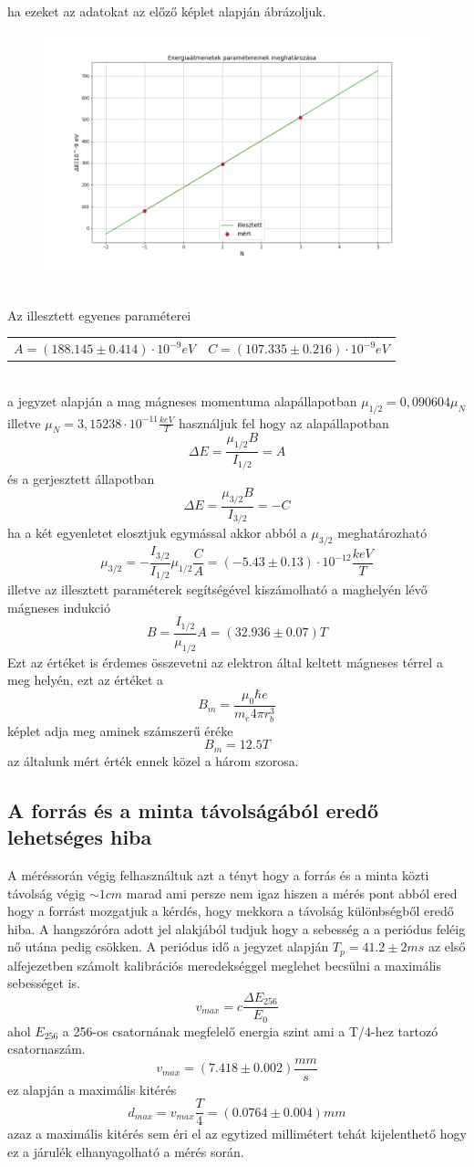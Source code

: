 \documentclass[a4paper,12pt]{article}
\numberwithin{equation}{subsection}
\begin{document}
\newpage
ha ezeket az adatokat az előző képlet alapján ábrázoljuk. 
\begin{figure}[h!]
\centering
\includegraphics[width=12cm]{parameterek.png}
\end{figure}
\\Az illesztett egyenes paraméterei 
\begin{table}[h!]
\centering
\begin{tabular}{c c}
$A=(188.145 \pm 0.414)\cdot 10^{-9} eV$ & $C=(107.335\pm0.216)\cdot 10^{-9}eV$
\end{tabular}
\end{table}
\\a jegyzet alapján a mag mágneses momentuma alapállapotban $\mu_{1/2}=0, 090604 \mu_N$ illetve $\mu_N=3, 15238\cdot 10^{-11} \frac{keV}{T}$ használjuk fel hogy az alapállapotban \[\Delta E=\frac{\mu_{1/2}B}{I_{1/2}}=A \] és a gerjesztett állapotban
\[\Delta E=\frac{\mu_{3/2}B}{I_{3/2}}=-C\]
ha a két egyenletet elosztjuk egymással akkor abból a $\mu_{3/2}$ meghatározható
\[\mu_{3/2}=-\frac{I_{3/2}}{I_{1/2}}\mu_{1/2}\frac{C}{A}=(-5.43\pm0.13)\cdot 10^{-12}\frac{keV}{T}\] illetve az illesztett paraméterek segítségével kiszámolható a maghelyén lévő mágneses indukció
\[B=\frac{I_{1/2}}{\mu_{1/2}}A=(32.936\pm0.07) T\]
Ezt az értéket is érdemes összevetni az elektron által keltett mágneses térrel a meg helyén, ezt az értéket a \[B_m=\frac{\mu_0\hbar e }{m_e 4 \pi r^3_b} \] képlet adja meg aminek számszerű éréke \[B_m=12.5T\] az általunk mért érték ennek közel a három szorosa.
\subsection{A forrás és a minta távolságából eredő lehetséges hiba}
A méréssorán végig felhasználtuk azt a tényt hogy a forrás és a minta közti távolság végig $\sim 1 cm$ marad ami persze nem igaz hiszen a mérés pont abból ered hogy a forrást mozgatjuk a kérdés, hogy mekkora a távolság különbségből eredő hiba. A hangszóróra adott jel alakjából tudjuk hogy a sebesség a a periódus feléig nő utána pedig csökken. A periódus idő a jegyzet alapján $T_p=41.2\pm2ms$ az első alfejezetben számolt kalibrációs meredekséggel meglehet becsülni a maximális sebességet is.  \[v_{max}=c\frac{\Delta E_{256}}{E_0}\] ahol $E_{256}$ a 256-os csatornának megfelelő energia szint ami a T/4-hez tartozó csatornaszám. \[v_{max}=(7.418\pm0.002)\frac{mm}{s}\] ez alapján a maximális kitérés \[d_{max}=v_{max}\frac{T}{4}=(0.0764\pm0.004) mm \] azaz a maximális kitérés sem éri el az egytized millimétert tehát kijelenthető hogy ez a járulék elhanyagolható a mérés során.
\end{document}
